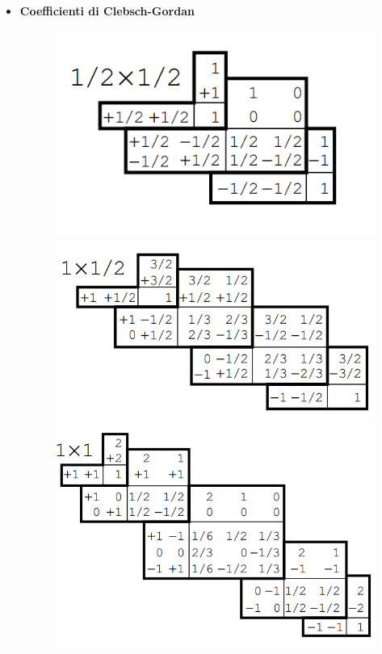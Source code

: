 \documentclass{article}
\begin{document}
\begin{footnotesize}
\begin{multicols*}{3}
\begin{itemize}[leftmargin=*]
	\item \textbf{Coefficienti di Clebsch-Gordan}
		\begin{figure}[H]
			\includegraphics[width=.49\linewidth]{cg_12_12.png}
			\includegraphics[width=.49\linewidth]{cg_1_12.png}
			\includegraphics[width=1\linewidth]{cg_1_1.png}
		\end{figure}
\end{itemize}
\end{multicols*}
\end{footnotesize}
\end{document}
